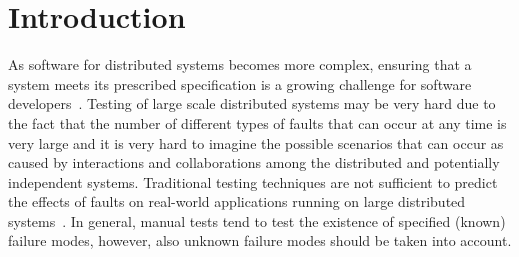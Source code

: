 \section{Introduction}
    
 
    
    
As software for distributed systems becomes more complex, ensuring that a system meets its prescribed specification is a growing challenge for software developers~\cite{dawson1996testing}. Testing of large scale distributed systems may be very hard due to the fact that the number of different types of faults that can occur at any time is very large and it is very hard to imagine the possible scenarios that can occur as caused by interactions and collaborations among the distributed and potentially independent systems. 
Traditional testing techniques are not sufficient to predict the effects of faults on real-world applications running on large distributed systems~\cite{FaaS}. In general, manual 
tests tend to test the existence of specified (known) failure modes, however, also %
unknown failure modes  should be taken into account.

